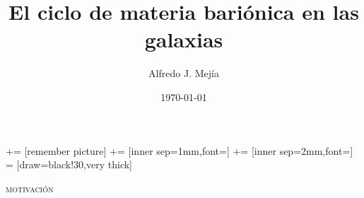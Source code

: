 \documentclass[xcolor=dvipsnames,4pt,fleqn,hyperref={colorlinks,citecolor=black,linkcolor=black,urlcolor=black}]{beamer}
\begin{document}
\footnotesize
{} += [remember picture]
    += [inner sep=1mm,font=\footnotesize]
            += [inner sep=2mm,font={\scshape}]
             = [draw=black!30,very thick]

\begin{frame}
\title{El ciclo de materia bariónica en las galaxias}
\author{Alfredo J. Mej\'ia}
\date{\today}

\maketitle
\end{frame}

\begin{frame}{\textsc{motivación}}

\begin{tikzpicture}[overlay]


\end{tikzpicture}
\end{frame}
\end{document}
